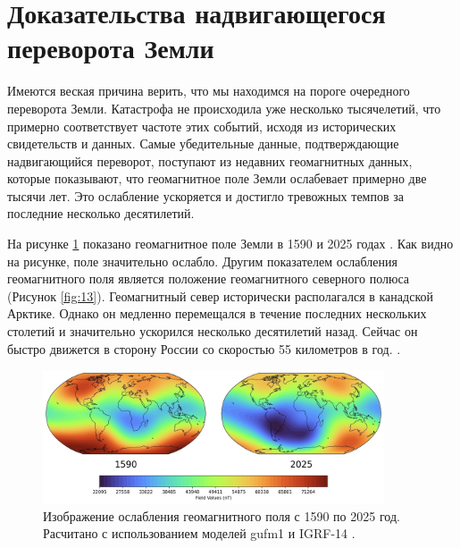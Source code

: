 \documentclass[10pt,twocolumn,letterpaper]{article}
\begin{document}
\section{Доказательства надвигающегося переворота Земли}

Имеются веская причина верить, что мы находимся на пороге очередного переворота Земли. Катастрофа не происходила уже несколько тысячелетий, что примерно соответствует частоте этих событий, исходя из исторических свидетельств и данных. Самые убедительные данные, подтверждающие надвигающийся переворот, поступают из недавних геомагнитных данных, которые показывают, что геомагнитное поле Земли ослабевает примерно две тысячи лет. Это ослабление ускоряется и достигло тревожных темпов за последние несколько десятилетий.

На рисунке \ref{fig:14} показано геомагнитное поле Земли в 1590 и 2025 годах \cite{125,126}. Как видно на рисунке, поле значительно ослабло.
Другим показателем ослабления геомагнитного поля является положение геомагнитного северного полюса (Рисунок \ref{fig:13}). Геомагнитный север исторически располагался в канадской Арктике. Однако он медленно перемещался в течение последних нескольких столетий и значительно ускорился несколько десятилетий назад. Сейчас он быстро движется в сторону России со скоростью 55 километров в год. \cite{124}.

\begin{figure}[t]
\begin{center}
\includegraphics[width=0.9\textwidth]{saa.jpg}
\end{center}
   \caption{Изображение ослабления геомагнитного поля с 1590 по 2025 год. Расчитано с использованием моделей gufm1 и IGRF-14 \cite{125,126}.}
\label{fig:14}
\end{figure}
\end{document}
